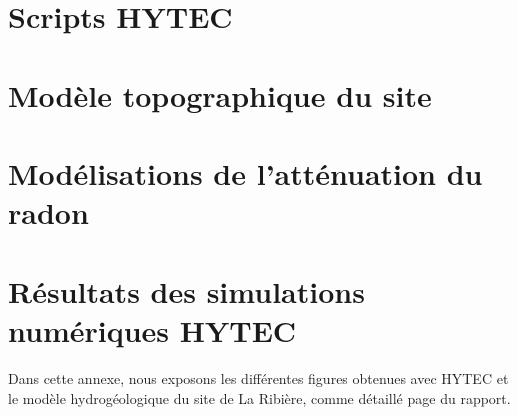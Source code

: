 \documentclass{article}
\begin{document}
\renewcommand\lstlistingname{Script n°}
\renewcommand\lstlistlistingname{}

\newpage
\section{Scripts HYTEC}
\label{lst:modele_hydro_chimie_final}

\newpage

\newpage



\newpage
\section{Modèle topographique du site}

\label{lst:modele_topo}

\newpage
\section{Modélisations de l'atténuation du radon}
\label{lst:modele_radon_1_1}


\newpage
\label{lst:modele_radon_1_2}



\newpage
\label{lst:modele_radon_2}

\newpage



\newpage
\section{Résultats des simulations numériques HYTEC}
\label{annexe:modele-transport-reactive}

\paragraph{} Dans cette annexe, nous exposons les différentes figures obtenues avec HYTEC et le modèle hydrogéologique du site de La Ribière, comme détaillé page \pageref{page:modele_hydro} du rapport.
\end{document}
